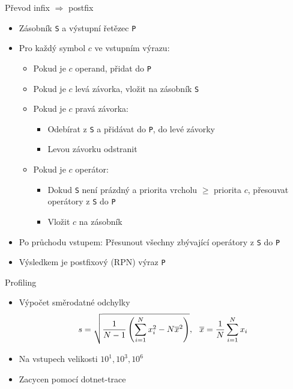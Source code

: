 \documentclass[fleqn]{beamer}
\begin{document}
\begin{frame}{Převod infix $\Rightarrow$ postfix}

\begin{itemize}
    \item Zásobník \texttt{S} a výstupní řetězec \texttt{P}\pause
    \item Pro každý symbol $c$ ve vstupním výrazu:\pause
    \begin{itemize}
        \item Pokud je $c$ operand, přidat do \texttt{P}
        \item Pokud je $c$ levá závorka, vložit na zásobník \texttt{S}
        \item Pokud je $c$ pravá závorka:\pause
        \begin{itemize}
            \item Odebírat z \texttt{S} a přidávat do \texttt{P}, do levé závorky\pause
            \item Levou závorku odstranit\pause
        \end{itemize}
        \item Pokud je $c$ operátor:\pause
        \begin{itemize}
            \item Dokud \texttt{S} není prázdný a priorita vrcholu $\geq$ priorita $c$, přesouvat operátory z \texttt{S} do \texttt{P}\pause
            \item Vložit $c$ na zásobník\pause
        \end{itemize}
    \end{itemize}
    \item Po průchodu vstupem: Přesunout všechny zbývající operátory z \texttt{S} do \texttt{P}\pause
    \item Výsledkem je postfixový (RPN) výraz \texttt{P}
\end{itemize}

\end{frame}










\begin{frame}{Profiling}

\begin{itemize}
    \item Výpočet směrodatné odchylky
    \[
    s = \sqrt{\frac{1}{N-1} \left( \sum^{N}_{i=1} x^{2}_{i} - N\overline{x}^2\right)}, \hspace{0.25cm}
    \overline{x} = \frac{1}{N}\sum^{N}_{i=1} x_{i}
    \]
    \pause
    \item Na vstupech velikosti $10^1, 10^3, 10^6$
    \pause
    \item Zacycen pomocí dotnet-trace
\end{itemize}
    
\end{frame}
\end{document}
